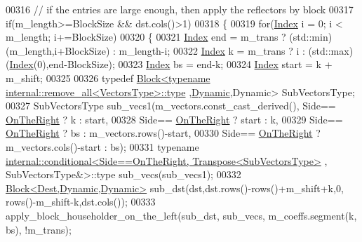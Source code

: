 \begin{DoxyCode}
00316       \textcolor{comment}{// if the entries are large enough, then apply the reflectors by block}
00317       \textcolor{keywordflow}{if}(m\_length>=BlockSize && dst.cols()>1)
00318       \{
00319         \textcolor{keywordflow}{for}(\hyperlink{group___core___module_a554f30542cc2316add4b1ea0a492ff02}{Index} i = 0; i < m\_length; i+=BlockSize)
00320         \{
00321           \hyperlink{group___core___module_a554f30542cc2316add4b1ea0a492ff02}{Index} end = m\_trans ? (std::min)(m\_length,i+BlockSize) : m\_length-i;
00322           \hyperlink{group___core___module_a554f30542cc2316add4b1ea0a492ff02}{Index} k = m\_trans ? i : (std::max)(\hyperlink{namespace_eigen_a62e77e0933482dafde8fe197d9a2cfde}{Index}(0),end-BlockSize);
00323           \hyperlink{group___core___module_a554f30542cc2316add4b1ea0a492ff02}{Index} bs = end-k;
00324           \hyperlink{group___core___module_a554f30542cc2316add4b1ea0a492ff02}{Index} start = k + m\_shift;
00325           
00326           \textcolor{keyword}{typedef} \hyperlink{group___core___module_class_eigen_1_1_block}{Block<typename internal::remove\_all<VectorsType>::type}
      ,\hyperlink{namespace_eigen_ad81fa7195215a0ce30017dfac309f0b2}{Dynamic},Dynamic> SubVectorsType;
00327           SubVectorsType sub\_vecs1(m\_vectors.const\_cast\_derived(), Side==
      \hyperlink{group__enums_ggac22de43beeac7a78b384f99bed5cee0ba99dc75d8e00b6c3a5bdc31940f47492b}{OnTheRight} ? k : start,
00328                                                                    Side==
      \hyperlink{group__enums_ggac22de43beeac7a78b384f99bed5cee0ba99dc75d8e00b6c3a5bdc31940f47492b}{OnTheRight} ? start : k,
00329                                                                    Side==
      \hyperlink{group__enums_ggac22de43beeac7a78b384f99bed5cee0ba99dc75d8e00b6c3a5bdc31940f47492b}{OnTheRight} ? bs : m\_vectors.rows()-start,
00330                                                                    Side==
      \hyperlink{group__enums_ggac22de43beeac7a78b384f99bed5cee0ba99dc75d8e00b6c3a5bdc31940f47492b}{OnTheRight} ? m\_vectors.cols()-start : bs);
00331           \textcolor{keyword}{typename} 
      \hyperlink{struct_eigen_1_1internal_1_1conditional}{internal::conditional<Side==OnTheRight, Transpose<SubVectorsType>}
      , SubVectorsType&>::type sub\_vecs(sub\_vecs1);
00332           \hyperlink{group___core___module_class_eigen_1_1_block}{Block<Dest,Dynamic,Dynamic>} sub\_dst(dst,dst.rows()-rows()+m\_shift+k,0,
       rows()-m\_shift-k,dst.cols());
00333           apply\_block\_householder\_on\_the\_left(sub\_dst, sub\_vecs, m\_coeffs.segment(k, bs), !m\_trans);

\end{DoxyCode}
